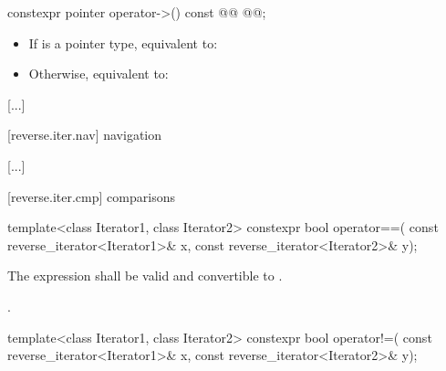 \setcounter{Paras}{1}

%
\begin{itemdecl}
constexpr pointer operator->() const @@
  @@;
\end{itemdecl}

\begin{itemdescr}
\pnum
{}
\begin{addedblock}
\effects
\begin{itemize}
\item If  is a pointer type, equivalent to: 

\item Otherwise, equivalent to: 
\end{itemize}
\end{addedblock}
\end{itemdescr}

[...]

[reverse.iter.nav]{ navigation}

[...]

[reverse.iter.cmp]{ comparisons}

{\color{oldclr}
\pnum
{}
} %

%
\begin{itemdecl}
template<class Iterator1, class Iterator2>
  constexpr bool operator==(
    const reverse_iterator<Iterator1>& x,
    const reverse_iterator<Iterator2>& y);
\end{itemdecl}

\begin{itemdescr}
{\color{newclr}
\pnum
\constraints
The expression  shall be valid and
convertible to .
} %

\pnum
\returns
{}.
\end{itemdescr}

%
\begin{itemdecl}
template<class Iterator1, class Iterator2>
  constexpr bool operator!=(
    const reverse_iterator<Iterator1>& x,
    const reverse_iterator<Iterator2>& y);
\end{itemdecl}

